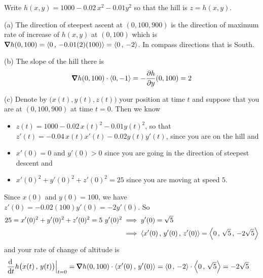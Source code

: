 \begin{solution}
 Write
$h(x,y) = 1000 -0.02\,x^2-0.01 y^2$ so that the hill is $z=h(x,y)$.

(a) The direction of steepest ascent at $(0,100,900)$
is the direction of maximum rate of increase of $h(x,y)$ at $(0,100)$
which is $\vnabla h(0,100) = \llt 0\,,\, -0.01(2)(100)\rgt
                           = \llt 0\,,\,-2\rgt$. In compass
directions that is South.

(b) The slope of the hill there is
\begin{align*}
\vnabla h(0,100)\cdot\llt 0,-1\rgt
=-\pdiff{h}{y}(0,100) = 2
\end{align*}

(c) Denote by $\big(x(t),y(t),z(t)\big)$ your position at time $t$
and suppose that you are at $(0,100,900)$ at time $t=0$. 
Then we know
\begin{itemize}
\item 
$z(t) = 1000 -0.02\,x(t)^2-0.01 y(t)^2$, so that
$z'(t) = -0.04\,x(t)x'(t)-0.02 y(t)y'(t)$,
 since you are on the hill and
\item 
$x'(0)=0$ and $y'(0)>0$ since you are going in the direction of steepest
descent and
\item 
$x'(0)^2+y'(0)^2+z'(0)^2=25$ since you are moving at speed $5$.
\end{itemize}
Since $x(0)$ and $y(0)=100$, we have $z'(0)= -0.02(100)y'(0) = -2y'(0)$. So
\begin{align*}
25 = x'(0)^2+y'(0)^2+z'(0)^2
   =5\ y'(0)^2
&\implies y'(0) = \sqrt{5} \\
&\implies \left< x'(0)\,,\,y'(0)\,,\,z'(0) \right>
          =\left< 0\,,\, \sqrt{5}\,,\, -2\sqrt{5}\right>
\end{align*}
and your rate of change of altitude is
\begin{align*}
\diff{}{t} h\big(x(t)\,,\,y(t)\big)\Big|_{t=0}
&=\vnabla h(0,100)\cdot \llt x'(0)\,,\,y'(0) \rgt
=\llt 0\,,\,-2\rgt \cdot \llt 0\,,\, \sqrt{5}\rgt
=-2\sqrt{5}
\end{align*}
\end{solution}

